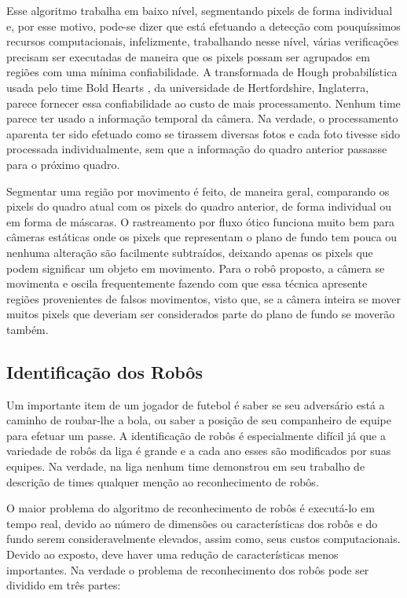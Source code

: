 Esse algoritmo trabalha em baixo nível, segmentando pixels de forma individual e, por esse motivo, pode-se dizer que está efetuando a detecção com pouquíssimos recursos computacionais, infelizmente, trabalhando nesse nível, várias verificações precisam ser executadas de maneira que os pixels possam ser agrupados em regiões com uma mínima confiabilidade. A transformada de Hough probabilística usada pelo time Bold Hearts , da universidade de Hertfordshire, Inglaterra, parece fornecer essa confiabilidade ao custo de mais processamento. Nenhum time parece ter usado a informação temporal da câmera. Na verdade, o processamento aparenta ter sido efetuado como se tirassem diversas fotos e cada foto tivesse sido processada individualmente, sem que a informação do quadro anterior passasse para o próximo quadro.

Segmentar uma região por movimento é feito, de maneira geral, comparando os pixels do quadro atual com os pixels do quadro anterior, de forma individual ou em forma de máscaras. O rastreamento por fluxo ótico \cite{Fleet} funciona muito bem para câmeras estáticas onde os pixels que representam o plano de fundo tem pouca ou nenhuma alteração são facilmente subtraídos, deixando apenas os pixels que podem significar um objeto em movimento. Para o robô proposto, a câmera se movimenta e oscila frequentemente fazendo com que essa técnica apresente regiões provenientes de falsos movimentos, visto que, se a câmera inteira se mover muitos pixels que deveriam ser considerados parte do plano de fundo se moverão também.


\subsection{Identificação dos Robôs}

Um importante item de um jogador de futebol é saber se seu adversário está a caminho de roubar-lhe a bola, ou saber a posição de seu companheiro de equipe para efetuar um passe. A identificação de robôs é especialmente difícil já que a variedade de robôs da liga é grande e a cada ano esses são modificados por suas equipes. Na verdade, na liga nenhum time demonstrou em seu trabalho de descrição de times qualquer menção ao reconhecimento de robôs.

O maior problema do algoritmo de reconhecimento de robôs é executá-lo em tempo real, devido ao número de dimensões ou características dos robôs e do fundo serem consideravelmente elevados, assim como, seus custos computacionais. Devido ao exposto, deve haver uma redução de características menos importantes. Na verdade o problema de reconhecimento dos robôs pode ser dividido em três partes:

